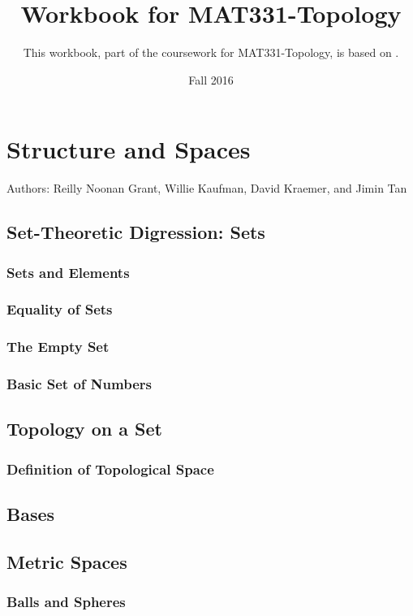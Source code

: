 \documentclass{book}
\title{Workbook for MAT331-Topology}
\date{Fall 2016}
\author{This workbook, part of the coursework for MAT331-Topology, is based on \cite{viro}.}
\begin{document}


\chapter{Structure and Spaces}
Authors: Reilly Noonan Grant, Willie Kaufman, David Kraemer, and Jimin Tan

\section{Set-Theoretic Digression: Sets}
\subsection{Sets and Elements}%
\subsection{Equality of Sets}%
\subsection{The Empty Set}%
\subsection{Basic Set of Numbers}%










\section{Topology on a Set}

\subsection{Definition of Topological Space}











%



\section{Bases}







\section{Metric Spaces} 
 
 
\subsection{Balls and Spheres}
 
 
 
 



\end{document}
